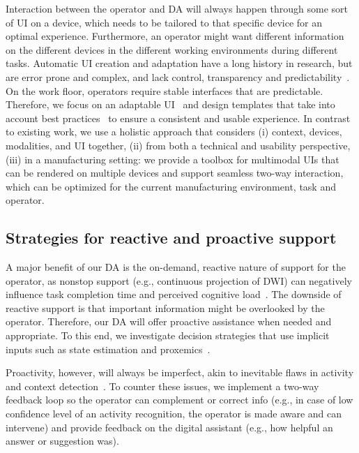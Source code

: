 Interaction between the operator and DA will always happen through some sort of UI on a device, which needs to be tailored to that specific device for an optimal experience. Furthermore, an operator might want different information on the different devices in the different working environments during different tasks. Automatic UI creation and adaptation have a long history in research, but are error prone and complex, and lack control, transparency and predictability~\cite{lavie2010BenefitsCostsAdaptive}. On the work floor, operators require stable interfaces that are predictable. Therefore, we focus on an adaptable UI~\cite{bunt2007SupportingInterfaceCustomization} and design templates that take into account best practices~\cite{ratzka2013UserInterfacePatterns} to ensure a consistent and usable experience. In contrast to existing work, we use a holistic approach that considers (i) context, devices, modalities, and UI together, (ii) from both a technical and usability perspective, (iii) in a manufacturing setting: we provide a toolbox for multimodal UIs that can be rendered on multiple devices and support seamless two-way interaction, which can be optimized for the current manufacturing environment, task and operator.

\subsection{Strategies for reactive and proactive support}\label{sec:ReactiveProactive}
A major benefit of our DA is the on-demand, reactive nature of support for the operator, as nonstop support (e.g., continuous projection of DWI) can negatively influence task completion time and perceived cognitive load~\cite{funk2017WorkingAugmentedReality}. The downside of reactive support is that important information might be overlooked by the operator. Therefore, our DA will offer proactive assistance when needed and appropriate. To this end, we investigate decision strategies that use implicit inputs such as state estimation and proxemics~\cite{Marquardt_2015,Williamson_2022,lindlbauer2019ContextAwareOnlineAdaptation}.

Proactivity, however, will always be imperfect, akin to inevitable flaws in activity and context detection~\cite{eshet2016ContextUseFinal}. To counter these issues, we implement a two-way feedback loop so the operator can complement or correct info (e.g., in case of low confidence level of an activity recognition, the operator is made aware and can intervene) and provide feedback on the digital assistant (e.g., how helpful an answer or suggestion was).

